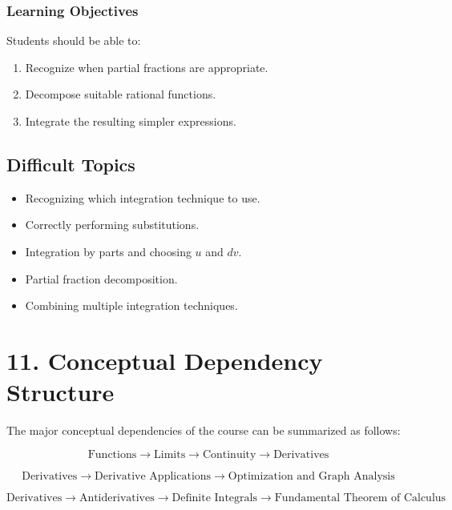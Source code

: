 \documentclass[11pt]{article}
\begin{document}
\subsubsection{Learning Objectives}

Students should be able to:

\begin{enumerate}
    \item Recognize when partial fractions are appropriate.
    \item Decompose suitable rational functions.
    \item Integrate the resulting simpler expressions.
\end{enumerate}

\subsection{Difficult Topics}

\begin{itemize}
    \item Recognizing which integration technique to use.
    \item Correctly performing substitutions.
    \item Integration by parts and choosing $u$ and $dv$.
    \item Partial fraction decomposition.
    \item Combining multiple integration techniques.
\end{itemize}

\section{11. Conceptual Dependency Structure}

The major conceptual dependencies of the course can be summarized as follows:

\[
\boxed{
\text{Functions}
\longrightarrow
\text{Limits}
\longrightarrow
\text{Continuity}
\longrightarrow
\text{Derivatives}
}
\]

\[
\boxed{
\text{Derivatives}
\longrightarrow
\text{Derivative Applications}
\longrightarrow
\text{Optimization and Graph Analysis}
}
\]

\[
\boxed{
\text{Derivatives}
\longrightarrow
\text{Antiderivatives}
\longrightarrow
\text{Definite Integrals}
\longrightarrow
\text{Fundamental Theorem of Calculus}
}
\]
\end{document}
